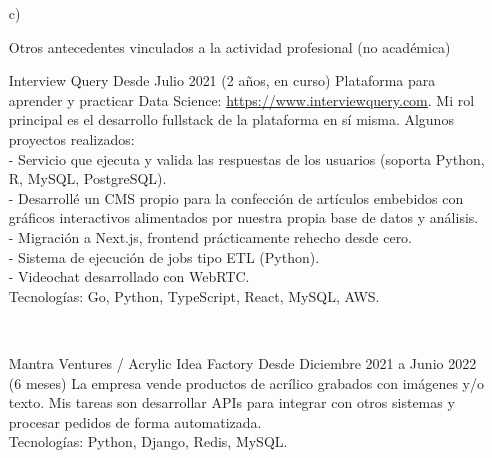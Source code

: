 \begin{enumerate}[leftmargin=0.8cm]

  \item[c)]{Otros antecedentes vinculados a la actividad profesional (no académica)

    \begin{itemize}[leftmargin=0.2cm]

      {Interview Query}
      {Desde Julio 2021 (2 años, en curso)}
      {
        Plataforma para aprender y practicar Data Science: \url{https://www.interviewquery.com}. Mi rol principal es el desarrollo fullstack de la plataforma en sí misma. Algunos proyectos realizados:
        \\ - Servicio que ejecuta y valida las respuestas de los usuarios (soporta Python, R, MySQL, PostgreSQL).
        \\ - Desarrollé un CMS propio para la confección de artículos embebidos con gráficos interactivos alimentados por nuestra propia base de datos y análisis.
        \\ - Migración a Next.js, frontend prácticamente rehecho desde cero.
        \\ - Sistema de ejecución de jobs tipo ETL (Python).
        \\ - Videochat desarrollado con WebRTC.
        \\ Tecnologías: Go, Python, TypeScript, React, MySQL, AWS.
      }

      ~

      {Mantra Ventures / Acrylic Idea Factory}
      {Desde Diciembre 2021 a Junio 2022 (6 meses)}
      {
        La empresa vende productos de acrílico grabados con imágenes y/o texto. Mis tareas son desarrollar APIs para integrar con otros sistemas y procesar pedidos de forma automatizada.
        \\ Tecnologías: Python, Django, Redis, MySQL.
      }

      ~


\end{itemize}}
\end{enumerate}
